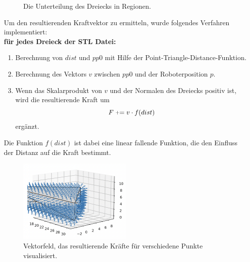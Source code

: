 \documentclass[conference]{IEEEtran}
\begin{document}
\begin{figure}[h]
    \caption{Die Unterteilung des Dreiecks in Regionen.}
\end{figure}
\begin{samepage}
    Um den resultierenden Kraftvektor zu ermitteln, wurde folgendes Verfahren implementiert: \\
    \textbf{für jedes Dreieck der STL Datei:}
    \begin{enumerate}
        \item Berechnung von $dist$ und $pp0$ mit Hilfe der Point-Triangle-Distance-Funktion.
        \item Berechnung des Vektors $v$ zwischen $pp0$ und der Roboterposition $p$.
        \item Wenn das Skalarprodukt von $v$ und der Normalen des Dreiecks positiv ist, wird die 
        resultierende Kraft um
        \begin{equation*}
            F \mathrel{\raisebox{0.19ex}{$\scriptstyle+$}}= v \cdot f(dist)
        \end{equation*}
        ergänzt. 
    \end{enumerate}
    Die Funktion $f(dist)$ ist dabei eine linear fallende Funktion, die den Einfluss der Distanz 
    auf die Kraft bestimmt.
\end{samepage}

\begin{figure}[h]
    \centering
    \includegraphics[width=0.5\textwidth]{pics/vectorfield.png}
    \caption{Vektorfeld, das resultierende Kräfte für verschiedene Punkte visualisiert.}
    \label{fig:vectorfield}
\end{figure}
\end{document}
